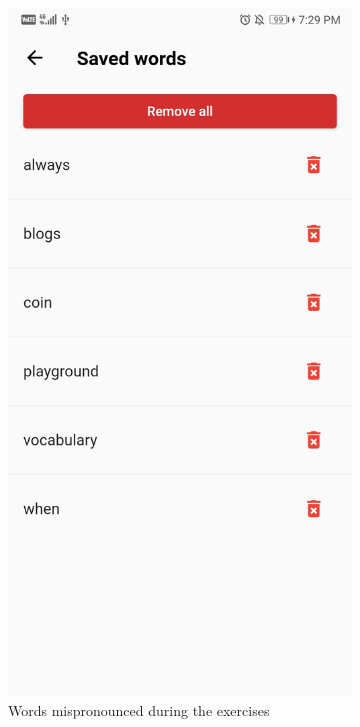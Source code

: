 \begin{appendices}
\begin{landscape}
\begin{figure}[h]
\begin{subfigure}{.25\textwidth}
    \includegraphics[width=.75\linewidth]{content/imgs/screen10.jpg}
    \caption{Words mispronounced during the exercises}
  \end{subfigure}%
  \begin{subfigure}{.25\textwidth}
    \centering

\end{subfigure}
\end{figure}
\end{landscape}
\end{appendices}
